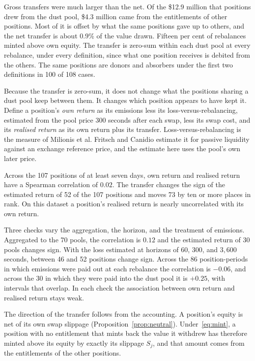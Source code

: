 \documentclass[11pt,a4paper]{article}
\theoremstyle{siphon}
\begin{document}
\noindent Gross transfers were much larger than the net. Of the \$12.9 million that positions drew from the dust pool, \$4.3 million came from the entitlements of other positions. Most of it is offset by what the same positions gave up to others, and the net transfer is about $0.9\%$ of the value drawn. Fifteen per cent of rebalances minted above own equity. The transfer is zero-sum within each dust pool at every rebalance, under every definition, since what one position receives is debited from the others. The same positions are donors and absorbers under the first two definitions in 100 of 108 cases.

Because the transfer is zero-sum, it does not change what the positions sharing a dust pool keep between them. It changes which position appears to have kept it. Define a position's \emph{own return} as its emissions less its loss-versus-rebalancing, estimated from the pool price 300 seconds after each swap, less its swap cost, and its \emph{realised return} as its own return plus its transfer. Loss-versus-rebalancing is the measure of Milionis et al.\cite{milionis2022b} Fritsch and Canidio\cite{fritsch2024} estimate it for passive liquidity against an exchange reference price, and the estimate here uses the pool's own later price.

Across the 107 positions of at least seven days, own return and realised return have a Spearman correlation of $0.02$. The transfer changes the sign of the estimated return of 52 of the 107 positions and moves 73 by ten or more places in rank. On this dataset a position's realised return is nearly uncorrelated with its own return.

Three checks vary the aggregation, the horizon, and the treatment of emissions. Aggregated to the 70 pools, the correlation is $0.12$ and the estimated return of 30 pools changes sign. With the loss estimated at horizons of 60, 300, and $3{,}600$ seconds, between 46 and 52 positions change sign. Across the 86 position-periods in which emissions were paid out at each rebalance the correlation is $-0.06$, and across the 30 in which they were paid into the dust pool it is $+0.25$, with intervals that overlap. In each check the association between own return and realised return stays weak.

The direction of the transfer follows from the accounting. A position's equity is net of its own swap slippage (Proposition~\ref{prop:neutral}). Under~\eqref{eq:mint}, a position with no entitlement that mints back the value it withdrew has therefore minted above its equity by exactly its slippage $S_j$, and that amount comes from the entitlements of the other positions.
\end{document}
